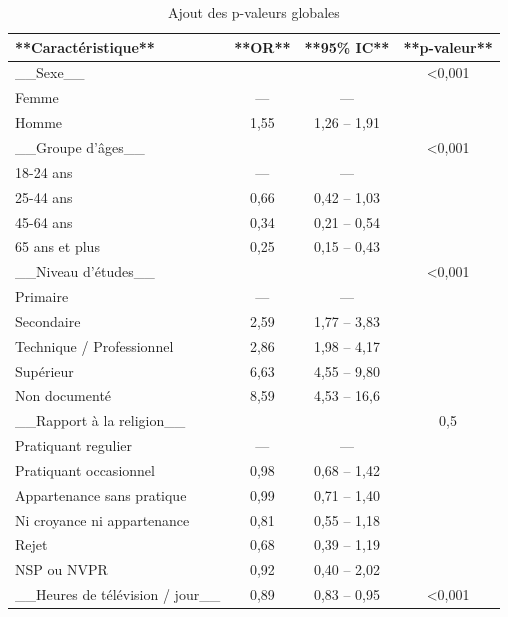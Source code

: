 \documentclass[
  letterpaper,
  DIV=11,
  numbers=noendperiod,
  oneside]{scrreprt}
\begin{document}
\hypertarget{tbl-regression-logistique-global-p}{}
\begin{table}
\caption{\label{tbl-regression-logistique-global-p}Ajout des p-valeurs globales }\tabularnewline

\centering
\begin{tabular}{l|c|c|c}
\hline
**Caractéristique** & **OR** & **95\% IC** & **p-valeur**\\
\hline
\_\_Sexe\_\_ &  &  & <0,001\\
\hline
Femme & — & — & \\
\hline
Homme & 1,55 & 1,26 – 1,91 & \\
\hline
\_\_Groupe d'âges\_\_ &  &  & <0,001\\
\hline
18-24 ans & — & — & \\
\hline
25-44 ans & 0,66 & 0,42 – 1,03 & \\
\hline
45-64 ans & 0,34 & 0,21 – 0,54 & \\
\hline
65 ans et plus & 0,25 & 0,15 – 0,43 & \\
\hline
\_\_Niveau d'études\_\_ &  &  & <0,001\\
\hline
Primaire & — & — & \\
\hline
Secondaire & 2,59 & 1,77 – 3,83 & \\
\hline
Technique / Professionnel & 2,86 & 1,98 – 4,17 & \\
\hline
Supérieur & 6,63 & 4,55 – 9,80 & \\
\hline
Non documenté & 8,59 & 4,53 – 16,6 & \\
\hline
\_\_Rapport à la religion\_\_ &  &  & 0,5\\
\hline
Pratiquant regulier & — & — & \\
\hline
Pratiquant occasionnel & 0,98 & 0,68 – 1,42 & \\
\hline
Appartenance sans pratique & 0,99 & 0,71 – 1,40 & \\
\hline
Ni croyance ni appartenance & 0,81 & 0,55 – 1,18 & \\
\hline
Rejet & 0,68 & 0,39 – 1,19 & \\
\hline
NSP ou NVPR & 0,92 & 0,40 – 2,02 & \\
\hline
\_\_Heures de télévision / jour\_\_ & 0,89 & 0,83 – 0,95 & <0,001\\
\hline
\end{tabular}
\end{table}
\end{document}
